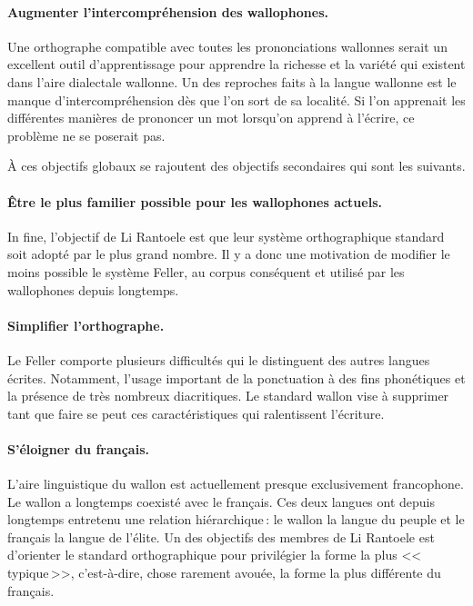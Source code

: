 \documentclass[french]{article}
\begin{document}
\paragraph{Augmenter l'intercompréhension des wallophones.} Une orthographe compatible avec toutes les prononciations wallonnes serait un excellent outil d'apprentissage pour apprendre la richesse et la variété qui existent dans l'aire dialectale wallonne. Un des reproches faits à la langue wallonne est le manque d'intercompréhension dès que l'on sort de sa localité. Si l'on apprenait les différentes manières de prononcer un mot lorsqu'on apprend à l'écrire, ce problème ne se poserait pas.

À ces objectifs globaux se rajoutent des objectifs secondaires qui sont les suivants.

\paragraph{Être le plus familier possible pour les wallophones actuels.} In fine, l'objectif de Li Rantoele est que leur système orthographique standard soit adopté par le plus grand nombre. Il y a donc une motivation de modifier le moins possible le système Feller, au corpus conséquent et utilisé par les wallophones depuis longtemps.

\paragraph{Simplifier l'orthographe.} Le Feller comporte plusieurs difficultés qui le distinguent des autres langues écrites. Notamment, l'usage important de la ponctuation à des fins phonétiques et la présence de très nombreux diacritiques. Le standard wallon vise à supprimer tant que faire se peut ces caractéristiques qui ralentissent l'écriture.

\paragraph{S'éloigner du français.} L'aire linguistique du wallon est actuellement presque exclusivement francophone. Le wallon a longtemps coexisté avec le français. Ces deux langues ont depuis longtemps entretenu une relation hiérarchique\,: le wallon la langue du peuple et le français la langue de l'élite. Un des objectifs des membres de Li Rantoele est d'orienter le standard orthographique pour privilégier la forme la plus <<\,typique\,>>, c'est-à-dire, chose rarement avouée, la forme la plus différente du français.
\end{document}
